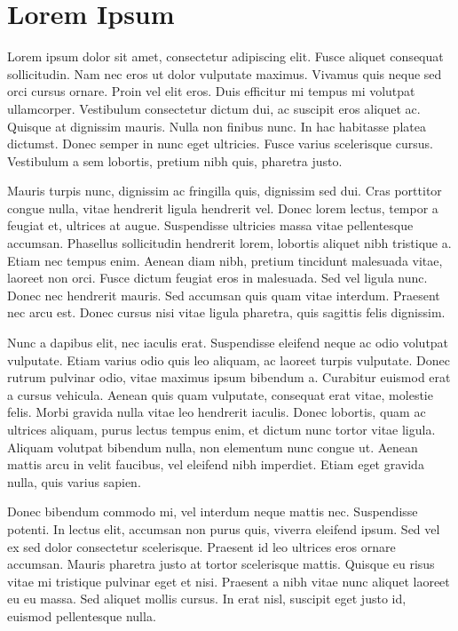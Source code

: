 \chapter{Lorem Ipsum}

Lorem ipsum dolor sit amet, consectetur adipiscing elit. Fusce aliquet consequat sollicitudin. Nam nec eros ut dolor vulputate maximus. Vivamus quis neque sed orci cursus ornare. Proin vel elit eros. Duis efficitur mi tempus mi volutpat ullamcorper. Vestibulum consectetur dictum dui, ac suscipit eros aliquet ac. Quisque at dignissim mauris. Nulla non finibus nunc. In hac habitasse platea dictumst. Donec semper in nunc eget ultricies. Fusce varius scelerisque cursus. Vestibulum a sem lobortis, pretium nibh quis, pharetra justo.

Mauris turpis nunc, dignissim ac fringilla quis, dignissim sed dui. Cras porttitor congue nulla, vitae hendrerit ligula hendrerit vel. Donec lorem lectus, tempor a feugiat et, ultrices at augue. Suspendisse ultricies massa vitae pellentesque accumsan. Phasellus sollicitudin hendrerit lorem, lobortis aliquet nibh tristique a. Etiam nec tempus enim. Aenean diam nibh, pretium tincidunt malesuada vitae, laoreet non orci. Fusce dictum feugiat eros in malesuada. Sed vel ligula nunc. Donec nec hendrerit mauris. Sed accumsan quis quam vitae interdum. Praesent nec arcu est. Donec cursus nisi vitae ligula pharetra, quis sagittis felis dignissim.

Nunc a dapibus elit, nec iaculis erat. Suspendisse eleifend neque ac odio volutpat vulputate. Etiam varius odio quis leo aliquam, ac laoreet turpis vulputate. Donec rutrum pulvinar odio, vitae maximus ipsum bibendum a. Curabitur euismod erat a cursus vehicula. Aenean quis quam vulputate, consequat erat vitae, molestie felis. Morbi gravida nulla vitae leo hendrerit iaculis. Donec lobortis, quam ac ultrices aliquam, purus lectus tempus enim, et dictum nunc tortor vitae ligula. Aliquam volutpat bibendum nulla, non elementum nunc congue ut. Aenean mattis arcu in velit faucibus, vel eleifend nibh imperdiet. Etiam eget gravida nulla, quis varius sapien.

Donec bibendum commodo mi, vel interdum neque mattis nec. Suspendisse potenti. In lectus elit, accumsan non purus quis, viverra eleifend ipsum. Sed vel ex sed dolor consectetur scelerisque. Praesent id leo ultrices eros ornare accumsan. Mauris pharetra justo at tortor scelerisque mattis. Quisque eu risus vitae mi tristique pulvinar eget et nisi. Praesent a nibh vitae nunc aliquet laoreet eu eu massa. Sed aliquet mollis cursus. In erat nisl, suscipit eget justo id, euismod pellentesque nulla.

